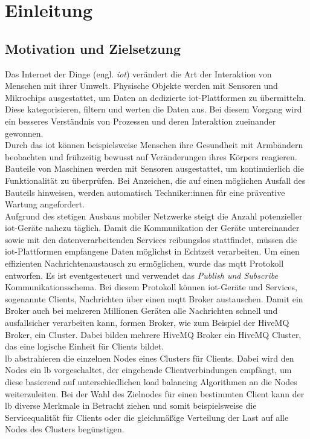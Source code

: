\section{Einleitung}
\subsection{Motivation und Zielsetzung}
Das Internet der Dinge (engl. \textit{\acf{iot}}) verändert die Art der Interaktion von Menschen mit ihrer Umwelt. Physische Objekte werden mit Sensoren und Mikrochips ausgestattet, um Daten an dedizierte \ac{iot}-Plattformen zu übermitteln. Diese kategorisieren, filtern und werten die Daten aus. Bei diesem Vorgang wird ein besseres Verständnis von Prozessen und deren Interaktion zueinander gewonnen.
\\
Durch das \acl{iot} können beispielsweise Menschen ihre Gesundheit mit Armbändern beobachten und frühzeitig bewusst auf Veränderungen ihres Körpers reagieren. Bauteile von Maschinen werden mit Sensoren ausgestattet, um kontinuierlich die Funktionalität zu überprüfen. Bei Anzeichen, die auf einen möglichen Ausfall des Bauteils hinweisen, werden automatisch Techniker:innen für eine präventive Wartung angefordert.
\\
Aufgrund des stetigen Ausbaus mobiler Netzwerke steigt die Anzahl potenzieller \ac{iot}-Geräte nahezu täglich. Damit die Kommunikation der Geräte untereinander sowie mit den datenverarbeitenden Services reibungslos stattfindet, müssen die \ac{iot}-Plattformen empfangene Daten möglichst in Echtzeit verarbeiten.
Um einen effizienten Nachrichtenaustausch zu ermöglichen, wurde das \ac{mqtt} Protokoll entworfen.
Es ist eventgesteuert und verwendet das \textit{Publish und Subscribe} Kommunikationsschema.
Bei diesem Protokoll können \ac{iot}-Geräte und Services, sogenannte Clients, Nachrichten über einen \ac{mqtt} Broker austauschen.
Damit ein Broker auch bei mehreren Millionen Geräten alle Nachrichten schnell und ausfallsicher verarbeiten kann, formen Broker, wie zum Beispiel der HiveMQ Broker, ein Cluster. Dabei bilden mehrere HiveMQ Broker ein HiveMQ Cluster, das eine logische Einheit für Clients bildet.
\\
\acl{lb} abstrahieren die einzelnen Nodes eines Clusters für Clients.
Dabei wird den Nodes ein \acl{lb} vorgeschaltet, der eingehende Clientverbindungen empfängt, um diese basierend auf unterschiedlichen load balancing Algorithmen an die Nodes weiterzuleiten.
Bei der Wahl des Zielnodes für einen bestimmten Client kann der \acl{lb} diverse Merkmale in Betracht ziehen und somit beispielsweise die Servicequalität für Clients oder die gleichmä{\ss}ige Verteilung der Last auf alle Nodes des Clusters begünstigen.

